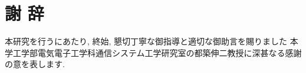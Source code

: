 \chapter*{謝 辞}

本研究を行うにあたり, 終始, 懇切丁寧な御指導と適切な御助言を賜りました
本学工学部電気電子工学科通信システム工学研究室の都築伸二教授に深甚なる感謝の意を表します.

